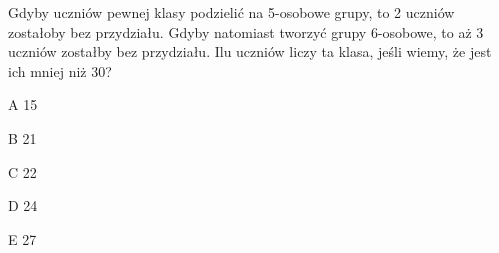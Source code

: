 \begin{tresc}
Gdyby uczniów pewnej klasy podzielić na 5-osobowe grupy, to 2 uczniów zostałoby bez przydziału. Gdyby natomiast tworzyć grupy 6-osobowe, to aż 3 uczniów zostałby bez przydziału. Ilu uczniów liczy ta klasa, jeśli wiemy, że jest ich mniej niż 30?
\end{tresc}
\begin{wariant}{A} 15 \end{wariant}
\begin{wariant}{B} 21 \end{wariant}
\begin{wariant}{C} 22 \end{wariant}
\begin{wariant}{D} 24 \end{wariant}
\begin{wariant}{E} 27 \end{wariant}
